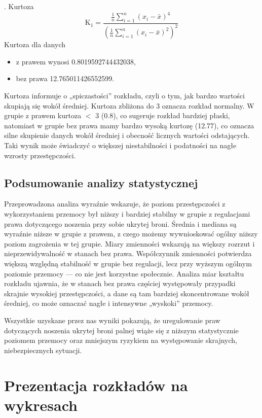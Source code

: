 \documentclass[a4paper,12pt]{article}
\begin{document}
	. Kurtoza
	\begin{equation}
		\text{K}_1 = \frac{\frac{1}{n} \sum_{i=1}^{n} (x_i - \bar x)^4}{\left(\frac{1}{n} \sum_{i=1}^{n} (x_i - \bar x)^2\right)^2}
	\end{equation}
	Kurtoza dla danych
	\begin{itemize}[itemsep=5pt,parsep=0pt]
		\item z prawem wynosi 0.8019592744432038,
		\item bez prawa 12.765011426552599.
	\end{itemize}
	Kurtoza informuje o „spiczastości” rozkładu, czyli o tym, jak bardzo wartości skupiają się wokół średniej. Kurtoza zbliżona do 3 oznacza rozkład normalny. W grupie z prawem kurtoza $<$ 3 (0.8), co sugeruje rozkład bardziej płaski, natomiast w grupie bez prawa mamy bardzo wysoką kurtozę (12.77), co oznacza silne skupienie danych wokół średniej i obecność licznych wartości odstających. Taki wynik może świadczyć o większej niestabilności i podatności na nagłe wzrosty przestępczości.\\
	
	\subsection{Podsumowanie analizy statystycznej} 
	Przeprowadzona analiza wyraźnie wskazuje, że poziom przestępczości z wykorzystaniem przemocy był niższy i bardziej stabilny w grupie z regulacjami prawa dotyczącego noszenia przy sobie ukrytej broni. Średnia i mediana są wyraźnie niższe w grupie z prawem, z czego możemy wywnioskować ogólny niższy poziom zagrożenia w tej grupie. Miary zmienności wskazują na większy rozrzut i nieprzewidywalność w stanach bez prawa. Współczynnik zmienności potwierdza większą względną stabilność w grupie bez regulacji, lecz przy wyższym ogólnym poziomie przemocy --- co nie jest korzystne społecznie. Analiza miar kształtu rozkładu ujawnia, że w stanach bez prawa częściej występowały przypadki skrajnie wysokiej przestępczości, a dane są tam bardziej skoncentrowane wokół średniej, co może oznaczać nagłe i intensywne „wyskoki” przemocy.
	
	Wszystkie uzyskane przez nas wyniki pokazują, że uregulowanie praw dotyczących noszenia ukrytej broni palnej wiąże się z niższym statystycznie poziomem przemocy oraz mniejszym ryzykiem na występowanie skrajnych, niebezpiecznych sytuacji.
	
	{\small \section{Prezentacja rozkładów na wykresach}}
\end{document}
